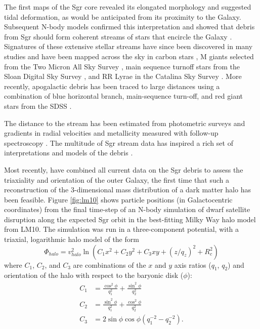 \documentclass[preprint]{aastex}
\begin{document}
The first maps of the Sgr core \citep{ibata94, ibata95} revealed its
elongated morphology and suggested tidal deformation, as would be
anticipated from its proximity to the Galaxy. Subsequent N-body models
confirmed this interpretation \citep{velazquez95} and showed that
debris from Sgr should form coherent streams of stars that encircle
the Galaxy \citep{johnston95}. Signatures of these extensive stellar
streams have since been discovered in many studies and have been
mapped across the sky in carbon stars \citep{totten98}, M giants
selected from the Two Micron All Sky Survey \citep{majewski03}, main
sequence turnoff stars from the Sloan Digital Sky Survey
\citep{belokurov06}, and RR Lyrae in the Catalina Sky Survey
\citep{drake13}. More recently, apogalactic debris has been traced to
large distances using a combination of blue horizontal branch,
main-sequence turn-off, and red giant stars from the SDSS
\citep{belokurov13}.

The distance to the stream has been estimated from photometric surveys
\citep[e.g.,][]{martinezdelgado04} and gradients in radial
velocities and metallicity measured with follow-up spectroscopy
\citep[e.g.,][]{majewski04, vivas05, bellazzini06, chou07,
  chou10, keller10, carlin12}. The multitude of Sgr stream data
has inspired a rich set of interpretations and models of the debris
\citep[e.g.,][]{johnston99b, helmi04, law05, fellhauer06,
  law10}.

Most recently, \citet[][hereafter LM10]{law10} have combined all
current data on the Sgr debris to assess the triaxiality and
orientation of the outer Galaxy, the first time that such a
reconstruction of the 3-dimensional mass distribution of a dark matter
halo has been feasible. Figure \ref{fig:lm10} shows particle positions
(in Galactocentric coordinates) from the final time-step of an N-body
simulation of dwarf satellite disruption along the expected Sgr orbit
in the best-fitting Milky Way halo model from LM10. The simulation was
run in a three-component potential, with a triaxial, logarithmic halo
model of the form
\begin{equation}
  \Phi_{halo} = v_{halo}^2 \ln(C_1 x^2 + C_2 y^2 + C_3 xy + (z/q_z)^2 + R_c^2)
\end{equation}
where $C_1$, $C_2$, and $C_3$ are combinations of the $x$ and $y$ axis
ratios ($q_1$, $q_2$) and orientation of the halo with respect to the
baryonic disk ($\phi$):
\begin{align}
  C_1 &= \frac{\cos^2\phi}{q_1^2} + \frac{\sin^2\phi}{q_2^2}\\
  C_2 &= \frac{\sin^2\phi}{q_1^2} + \frac{\cos^2\phi}{q_2^2}\\
  C_3 &= 2\sin\phi\cos\phi \left(q_1^{-2} - q_2^{-2}\right).
\end{align}
\end{document}
